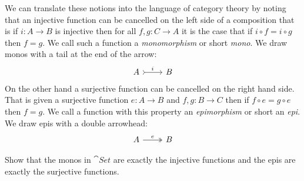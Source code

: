 We can translate these notions into the language of category theory by noting that an injective function can be cancelled on the left side of a composition that is if $i : A \to B$ is injective then for all $f,g : C \to A$ it is the case  that if $i \circ f = i \circ g$ then $f = g$. We call such a function a \emph{monomorphism} or short \emph{mono}. We draw monos with a tail at the end of the arrow:
\[\begin{tikzcd}
A \arrow[r,rightarrowtail,"i"]  & B
\end{tikzcd} 
\]
On the other hand a surjective function can be cancelled on the right hand side. That is given a surjective function $e : A \to B$ and $f,g : B \to C$ then if $f \circ e = g \circ e$ then $f = g$. We call a function with this property an\emph{ epimorphism} or short an \emph{epi}. We draw epis with a double arrowhead:
\[\begin{tikzcd}
A \arrow[r,twoheadrightarrow,"e"]  & B
\end{tikzcd}
\]
\begin{Exercise}
  Show that the monos in $\cat{Set}$ are exactly the injective functions and the epis are exactly the surjective functions.
\end{Exercise}
